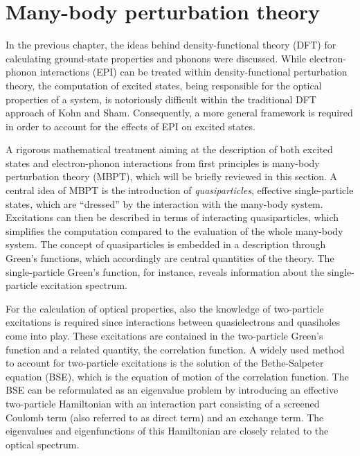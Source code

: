  \section{Many-body perturbation theory}\label{mbpt_sec}

 In the previous chapter, the ideas behind density-functional theory (DFT) for calculating ground-state properties and phonons were discussed. While electron-phonon interactions (EPI) can be treated within density-functional perturbation theory\cite{dfpt1,dfpt2}, the computation of excited states, being responsible for the optical properties of a system\cite{bechstedt2016many}, is notoriously difficult within the traditional DFT approach of Kohn and Sham\cite{Gross1996}. Consequently, a more general framework is required in order to account for the effects of EPI on excited states.\par A rigorous mathematical treatment aiming at the description of both excited states and electron-phonon interactions from first principles is many-body perturbation theory (MBPT), which will be briefly reviewed in this section. A central idea of MBPT is the introduction of \textit{quasiparticles}, effective single-particle states, which are ``dressed'' by the interaction with the many-body system. Excitations can then be described in terms of interacting quasiparticles, which simplifies the computation compared to the evaluation of the whole many-body system. The concept of quasiparticles is embedded in a description through Green's functions, which accordingly are central quantities of the theory\cite{fetterwalecka}. The single-particle Green's function, for instance, reveals information about the single-particle excitation spectrum.\par
For the calculation of optical properties, also the knowledge of two-particle excitations is required since interactions between quasielectrons and quasiholes come into play. These excitations are contained in the two-particle Green's function and a related quantity, the correlation function. A widely used method to account for two-particle excitations is the solution of the  Bethe-Salpeter equation (BSE), which is the equation of motion of the correlation function\cite{sagmeister}. The BSE can be reformulated as an eigenvalue problem by introducing an effective two-particle Hamiltonian with an interaction part consisting of a screened Coulomb term (also referred to as direct term) and an exchange term. The eigenvalues and eigenfunctions of this Hamiltonian are closely related to the optical spectrum.
